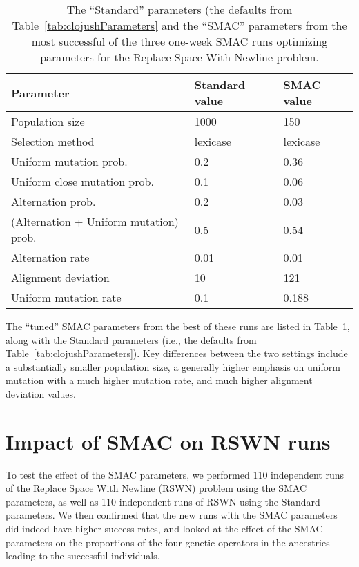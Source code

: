 \begin{table}
	\begin{center}
	\begin{tabular}{p{4cm} p{1.5cm} p{1.5cm}}
		Parameter & Standard value & SMAC  value \\
		\hline
		Population size & 1000 &  150 \\
		Selection method & lexicase & lexicase \\
		\hline
		Uniform mutation prob. & 0.2 & 0.36 \\
		Uniform close mutation prob. & 0.1 & 0.06 \\
		Alternation prob. & 0.2 & 0.03 \\
		(Alternation \linebreak + \quad Uniform mutation) prob. & 0.5 & 0.54 \\
		\hline
		Alternation rate & 0.01 & 0.01 \\
		Alignment deviation & 10 & 121 \\
		\hline
		Uniform mutation rate & 0.1 & 0.188
	\end{tabular}
	\end{center}
	\caption{The ``Standard'' parameters (the defaults from Table~\ref{tab:clojushParameters} and the ``SMAC'' parameters from the most successful of the three one-week SMAC
	runs optimizing parameters for the Replace Space With Newline problem.}
	\label{tab:SMACtunedParameters}
\end{table}

The ``tuned'' SMAC parameters from the best of these runs are listed in
Table~\ref{tab:SMACtunedParameters}, along with the Standard parameters
(i.e., the defaults from Table~\ref{tab:clojushParameters}). Key differences
between the two settings include a substantially smaller population size,
a generally higher emphasis on uniform mutation with a much higher
mutation rate, and much higher alignment deviation values.

\section{Impact of SMAC on RSWN runs}
\label{sec:SMACimpact}

To test the effect of the SMAC parameters, we performed 110
independent runs of the Replace Space With Newline (RSWN) problem using the
SMAC parameters, as well as 110 independent runs of RSWN using the
Standard parameters. We then confirmed that the new runs with the SMAC
parameters did indeed have higher success rates, and looked at the effect
of the SMAC parameters on the proportions of the four genetic operators
in the ancestries leading to the successful individuals.

